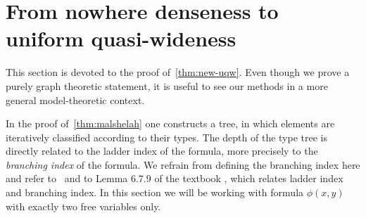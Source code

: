 \section{From nowhere denseness to uniform quasi-wideness}\label{sec:uqw}

This section is devoted to the proof of~\cref{thm:new-uqw}. 
Even though we prove a purely graph theoretic statement, 
it is useful to see our methods in a more general model-theoretic context. 


     


In the proof of~\cref{thm:malshelah} one constructs a tree, in which
elements are iteratively classified according to their types. The depth of 
the type tree is directly related to the ladder index of the formula, 
more precisely to the \emph{branching index} of the formula. We refrain
from defining the branching index here and refer to~\cite{malliaris2014regularity}
and to Lemma 6.7.9 of the textbook \cite{hodges1993model}, which relates
ladder index and branching index. In this section we will be working with 
formula $\phi(x,y)$ with exactly two free variables only. 

